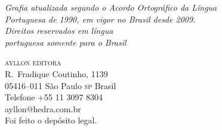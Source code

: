\vfill

\textit{Grafia atualizada segundo o Acordo Ortográfico da Língua\\
Portuguesa de 1990, em vigor no Brasil desde 2009.}\\

\textit{Direitos reservados em língua\\ 
portuguesa somente para o Brasil}\\\medskip

\textsc{ayllon editora}\\
R.~Fradique Coutinho, 1139\\
05416--011 São Paulo \textsc{sp} Brasil\\
Telefone +55 11 3097 8304\\\smallskip
ayllon@hedra.com.br\\
\bigskip
Foi feito o depósito legal.

\endgroup
\pagebreak